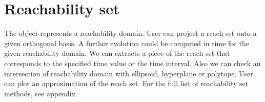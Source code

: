 \section{Reachability set}
The object represents a reachability domain.
User can project a reach set onto a given orthogonal basis.
A further evolution could be computed in time for the given reachability
domain. We can extracts a piece of the reach set that corresponds to the specified time
value or the time interval. Also we can check an intersection of reachability domain with
ellipsoid, hyperplane or polytope. User can plot an approximation of the reach set.
For the full list of reachability set methods, see appendix.
